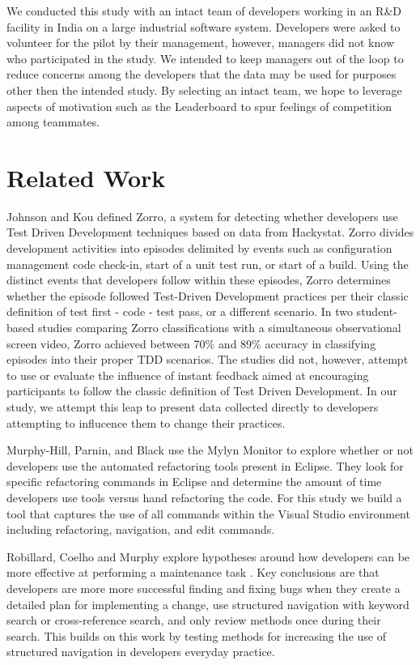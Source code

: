 \documentclass{sig-alternate}
\begin{document}
We conducted this study with an intact team of developers working in an R\&D facility in India on a large industrial software system.  Developers were asked to volunteer for the pilot by their management, however, managers did not know who participated in the study.  We intended to keep managers out of the loop to reduce concerns among the developers that the data may be used for purposes other then the intended study.  By selecting an intact team, we hope to leverage aspects of motivation such as the Leaderboard to spur feelings of competition among teammates.  

\section{Related Work}

Johnson and Kou defined Zorro\cite{V:Johnson2007Automated}, a system for detecting whether developers use Test Driven Development techniques based on data from Hackystat.  Zorro divides development activities into episodes delimited by events such as configuration management code check-in, start of a unit test run, or start of a build.  Using the distinct events that developers follow within these episodes, Zorro determines whether the episode followed Test-Driven Development practices per their classic definition of test first - code - test pass, or a different scenario.  In two student-based studies comparing Zorro classifications with a simultaneous observational screen video, Zorro achieved between 70\% \cite{Kou2010Operational} and 89\% \cite{V:Johnson2007Automated} accuracy in classifying episodes into their proper TDD scenarios.  The studies did not, however, attempt to use or evaluate the influence of instant feedback aimed at encouraging participants to follow the classic definition of Test Driven Development.  In our study, we attempt this leap to present data collected directly to developers attempting to influcence them to change their practices.

Murphy-Hill, Parnin, and Black \cite{V:MurphyHill2012How} use the Mylyn Monitor to explore whether or not developers use the automated refactoring tools present in Eclipse.  They look for specific refactoring commands in Eclipse and determine the amount of time developers use tools versus hand refactoring the code.  For this study we build a tool that captures the use of all commands within the Visual Studio environment including refactoring, navigation, and edit commands.

Robillard, Coelho and Murphy explore hypotheses around how developers can be more effective at performing a maintenance task \cite{wbsnipes:Robillard2004How}.  Key conclusions are that developers are more more successful finding and fixing bugs when they create a detailed plan for implementing a change, use structured navigation with keyword search or cross-reference search, and only review methods once during their search.  This builds on this work by testing methods for increasing the use of structured navigation in developers everyday practice.
\end{document}
